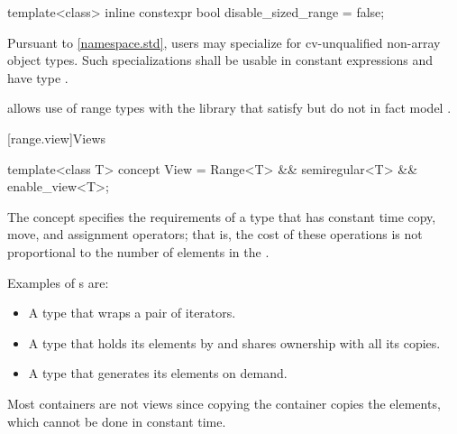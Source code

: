 %
\begin{itemdecl}
template<class>
  inline constexpr bool disable_sized_range = false;
\end{itemdecl}

\begin{itemdescr}
\pnum
\remarks
Pursuant to \ref{namespace.std},
users may specialize 
for cv-unqualified non-array object types.
Such specializations shall
be usable in constant expressions and
have type .

\pnum
\begin{note}
 allows use of range types with the library
that satisfy but do not in fact model .
\end{note}
\end{itemdescr}

[range.view]{Views}

%
\begin{itemdecl}
template<class T>
  concept View =
    Range<T> && semiregular<T> && enable_view<T>;
\end{itemdecl}

\begin{itemdescr}
\pnum
The  concept specifies the requirements of a  type
that has constant time copy, move, and assignment operators; that is, the cost of
these operations is not proportional to the number of elements in the
.

\pnum
\begin{example}
Examples of s are:

\begin{itemize}
\item A  type that wraps a pair of iterators.

\item A  type that holds its elements by 
and shares ownership with all its copies.

\item A  type that generates its elements on demand.
\end{itemize}

Most containers are not views since
copying the container copies the elements,
which cannot be done in constant time.
\end{example}
\end{itemdescr}

